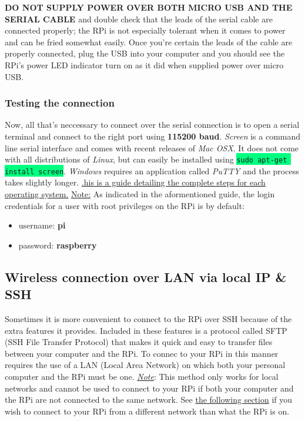 \documentclass{article}
\newcommand{\codei}[1]{\colorbox{SpringGreen}{\texttt{#1}}} %
\begin{document}
    \textbf{DO NOT SUPPLY POWER OVER BOTH MICRO USB AND THE SERIAL CABLE} and double check that the leads of the serial cable are connected properly; the RPi is not especially tolerant when it comes to power and can be fried somewhat easily. Once you're certain the leads of the cable are properly connected, plug the USB into your computer and you should see the RPi's power LED indicator turn on as it did when supplied power over micro USB.

    \subsubsection{Testing the connection}
    Now, all that's neccessary to connect over the serial connection is to open a serial terminal and connect to the right port using \textbf{115200 baud}. \textit{Screen} is a command line serial interface and comes with recent releases of \textit{Mac OSX}. It does not come with all distributions of \textit{Linux}, but can easily be installed using \codei{sudo apt-get install screen}. \textit{Windows} requires an application called \textit{PuTTY} and the process takes slightly longer. \href{https://learn.adafruit.com/adafruits-raspberry-pi-lesson-5-using-a-console-cable/test-and-configure}{.his is a guide detailing the complete steps for each operating system.}
    \newline\newline
    \underline{Note:} As indicated in the aformentioned guide, the login credentials for a user with root privileges on the RPi is by default:
    \begin{itemize}
      \item username: \textbf{pi}
      \item password: \textbf{raspberry}
    \end{itemize}
    \subsection{Wireless connection over LAN via local IP \& SSH}
    \label{sec:connect-ssh}
    Sometimes it is more convenient to connect to the RPi over SSH because of the extra features it provides. Included in these features is a protocol called SFTP (SSH File Transfer Protocol) that makes it quick and easy to transfer files between your computer and the RPi. To connec to your RPi in this manner requires the use of a LAN (Local Area Network) on which both your personal computer and the RPi must be one.
    \newline
    \newline
    \underline{\textit{Note}}: This method only works for local networks and cannot be used to connect to your RPi if both your computer and the RPi are not connected to the same network. See \hyperref[sec:connect-sshwan]{the following section} if you wish to connect to your RPi from a different network than what the RPi is on.
\end{document}
